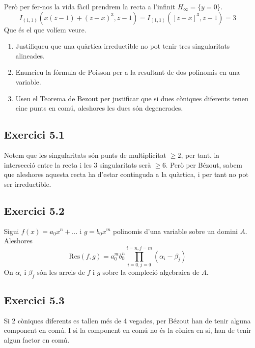 \documentclass[11pt, a4paper]{article}
\begin{document}
Però per fer-nos la vida fàcil prendrem la recta a l'infinit $H_{\infty}=\{y=0\}$.
\[
    I_{(1,1)}(x(z-1)+(z-x)^3,z-1)=
    I_{(1,1)}([z-x]^3,z-1)=3
\]
Que és el que volíem veure.
\newpage
\begin{tcolorbox}[title=\section{Exercici 5}]
\begin{enumerate}
    \item Justifiqueu que una quàrtica irreductible no pot tenir tres singularitats alineades.
    \item Enuncieu la fórmula de Poisson per a la resultant de dos polinomis en una variable.
    \item Useu el Teorema de Bezout per justificar que si dues còniques diferents tenen cinc punts en comú, aleshores les dues són degenerades.
    \end{enumerate}
\end{tcolorbox}
\subsection{Exercici 5.1}
Notem que les singularitats són punts de multiplicitat $\geq 2$, per tant, la intersecció entre la recta i les 3 singularitats serà $\geq6$. Però per Bézout, sabem que aleshores aquesta recta ha d'estar continguda a la quàrtica, i per tant no pot ser irreductible.
\subsection{Exercici 5.2}
Sigui $f(x)=a_0x^n+\dots$ i $g=b_0x^m$ polinomis d'una variable sobre un domini $A$. Aleshores 
\[
    \mathrm{Res}(f,g)=a_0^mb_0^n\prod_{i=0,j=0}^{i=n, j=m}(\alpha_i-\beta_j)
\]
On $\alpha_i$ i $\beta_j$ són les arrels de $f$ i $g$ sobre la compleció algebraica de $A$.
\subsection{Exercici 5.3}
Si 2 còniques diferents es tallen més de 4 vegades, per Bézout han de tenir alguna component en comú. I si la component en comú no és la cònica en si, han de tenir algun factor en comú.
\end{document}
